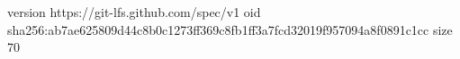 version https://git-lfs.github.com/spec/v1
oid sha256:ab7ae625809d44c8b0c1273ff369c8fb1ff3a7fcd32019f957094a8f0891c1cc
size 70

